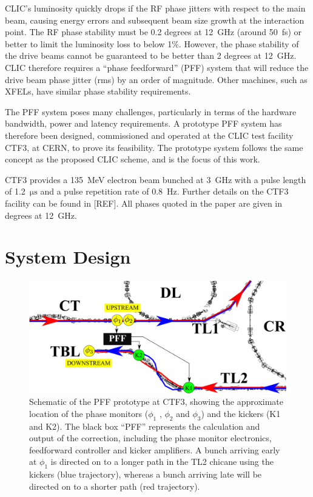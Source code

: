 \documentclass[%
 reprint,
 amsmath,amssymb,
 prl,
]{revtex4-1}
\begin{document}
CLIC's luminosity quickly drops if the RF phase jitters with respect to the 
main beam, causing energy errors and subsequent beam size growth at the 
interaction point. The RF phase 
stability must be 0.2 degrees at 12~GHz (around 50~fs) or better to limit the luminosity loss 
to below 1\%.  However, the phase stability of the drive beams cannot be 
guaranteed to be better than 2 
degrees at 12~GHz. CLIC therefore requires a ``phase feedforward'' (PFF) 
system that will reduce the drive beam phase jitter (rms) by an order of 
magnitude. Other machines, such as XFELs, have similar phase stability 
requirements.

The PFF system poses many challenges, particularly in terms of the hardware 
bandwidth, power and latency requirements. A prototype PFF system has therefore 
been designed, commissioned and operated at the CLIC 
test facility CTF3, at CERN, to prove its feasibility. The prototype system 
follows the same concept as the proposed CLIC scheme, and is the focus of this 
work. 

CTF3 provides a 135~MeV electron beam bunched at 3~GHz with a pulse length of 
1.2~\(\mathrm{\mu s}\) and a pulse repetition rate of 0.8~Hz. Further details 
on the CTF3 facility can be found in [REF]. All phases quoted 
in the paper are given in degrees at 12~GHz.

\section{\label{s:ctfLayout}System Design}

\begin{figure}
	\includegraphics[width=\textwidth]{figs/ctfpffLayout}%
	\caption{\label{fig:pffLayout}Schematic of the PFF prototype at CTF3, 
	showing the approximate location of the phase monitors (\(\phi_1\) , 
	\(\phi_2\) and \(\phi_3\)) and
		the kickers (K1 and K2). The black box “PFF” represents the calculation 
		and output of the correction, including the phase monitor
		electronics, feedforward controller and kicker amplifiers. A bunch 
		arriving early at \(\phi_1\) is directed on to a longer path in the TL2 
		chicane
		using the kickers (blue trajectory), whereas a bunch arriving late will 
		be directed on to a shorter path (red trajectory). }
\end{figure}
\end{document}
